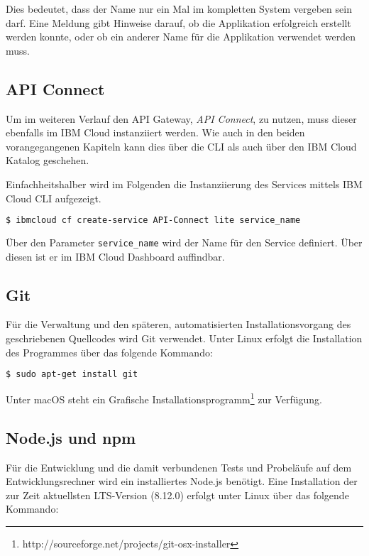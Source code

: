 Dies bedeutet, dass der Name nur ein Mal im kompletten System vergeben sein darf. Eine Meldung gibt Hinweise darauf, ob
die Applikation erfolgreich erstellt werden konnte, oder ob ein anderer Name für die Applikation verwendet werden muss.

\subsection{API Connect}
\label{subsec:apiconnect}
Um im weiteren Verlauf den API Gateway, \textit{API Connect}, zu nutzen, muss dieser ebenfalls im IBM Cloud
instanziiert werden. Wie auch in den beiden vorangegangenen Kapiteln kann dies über die CLI als auch über den IBM Cloud
Katalog geschehen.

Einfachheitshalber wird im Folgenden die Instanziierung des Services mittels IBM Cloud CLI aufgezeigt.

\begin{lstlisting}[language=bash, caption=Instanziierung von API Connect, label=Instanziierung von API Connect]
$ ibmcloud cf create-service API-Connect lite service_name
\end{lstlisting}

Über den Parameter \texttt{service\_name} wird der Name für den Service definiert. Über diesen ist er im IBM Cloud
Dashboard auffindbar.

\subsection{Git}
Für die Verwaltung und den späteren, automatisierten Installationsvorgang des geschriebenen Quellcodes wird Git verwendet.
Unter Linux erfolgt die Installation des Programmes über das folgende Kommando:

\begin{lstlisting}[language=bash, caption=Installation von Git, label=Installation von Git]
    $ sudo apt-get install git
\end{lstlisting}

Unter macOS steht ein Grafische Installationsprogramm\footnote{http://sourceforge.net/projects/git-osx-installer} zur
Verfügung.

\subsection{Node.js und npm}
Für die Entwicklung und die damit verbundenen Tests und Probeläufe auf dem Entwicklungsrechner wird ein installiertes
Node.js benötigt. Eine Installation der zur Zeit aktuellsten LTS-Version (8.12.0) erfolgt unter Linux über das folgende
Kommando:

